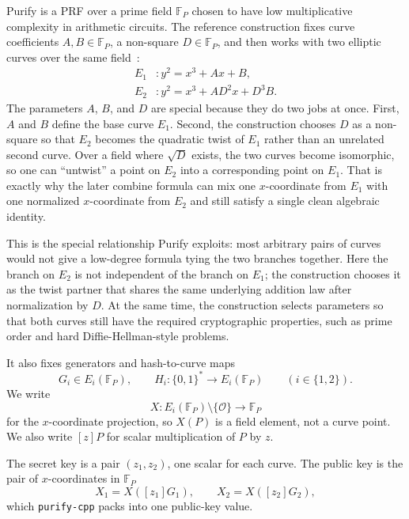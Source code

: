 \documentclass[11pt]{article}
\begin{document}
Purify is a PRF over a prime field $\mathbb{F}_P$ chosen to have low multiplicative complexity in
arithmetic circuits. The reference construction fixes curve coefficients $A, B \in \mathbb{F}_P$,
a non-square $D \in \mathbb{F}_P$, and then works with two elliptic
curves over the same
field~\cite{musig-dn,purify-ref}:
\[
\begin{aligned}
E_1 &: y^2 = x^3 + Ax + B, \\
E_2 &: y^2 = x^3 + AD^2x + D^3B.
\end{aligned}
\]
The parameters $A$, $B$, and $D$ are special because they do two jobs at once.
First, $A$ and $B$ define the base curve $E_1$. Second, the construction chooses
$D$ as a non-square so that $E_2$ becomes the quadratic twist of $E_1$ rather
than an unrelated second curve. Over a field where $\sqrt{D}$ exists, the two
curves become isomorphic, so one can ``untwist'' a point on $E_2$ into a
corresponding point on $E_1$. That is exactly why the later combine formula can mix one
$x$-coordinate from $E_1$ with one normalized $x$-coordinate from $E_2$ and
still satisfy a single clean algebraic identity.

This is the special relationship Purify exploits: most arbitrary pairs of
curves would not give a low-degree formula tying the two branches together. Here
the branch on $E_2$ is not independent of the branch on $E_1$; the construction chooses it as
the twist partner that shares the same underlying addition law after
normalization by $D$. At the same time, the construction selects parameters so that both
curves still have the required cryptographic properties, such as prime order and
hard Diffie-Hellman-style problems.

It also fixes generators and hash-to-curve maps
\[
G_i \in E_i(\mathbb{F}_P), \qquad
H_i : \{0,1\}^* \to E_i(\mathbb{F}_P)
\qquad (i \in \{1,2\}).
\]
We write
\[
X : E_i(\mathbb{F}_P) \setminus \{\mathcal{O}\} \to \mathbb{F}_P
\]
for the $x$-coordinate projection, so $X(P)$ is a field element, not a curve point. We also write
$[z]P$ for scalar multiplication of $P$ by $z$.

The secret key is a pair $(z_1, z_2)$, one scalar for each curve. The public key is the pair of
$x$-coordinates in $\mathbb{F}_P$
\[
X_1 = X([z_1]G_1), \qquad X_2 = X([z_2]G_2),
\]
which \texttt{purify-cpp} packs into one public-key value.
\end{document}
